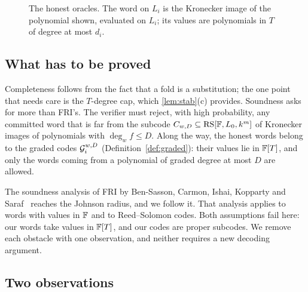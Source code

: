 \begin{figure}[t]
\centering
{}
\caption{The honest oracles. The word on $L_i$ is the Kronecker image of the polynomial shown,
evaluated on $L_i$; its values are polynomials in $T$ of degree at most $d_i$.}
\label{fig:chain}
\end{figure}

\subsection{What has to be proved}\label{sec:ov-target}

Completeness follows from the fact that a fold is a substitution; the one point that needs
care is the $T$-degree cap, which \cref{lem:stab}(c) provides. Soundness asks for more than
FRI's. The verifier must reject, with high probability, any committed word that is far from
the subcode $C_{w,D}\subseteq\mathrm{RS}[\mathbb{F},L_0,k^m]$ of Kronecker images of polynomials with
$\deg_wf\le D$. Along the way, the honest words belong to the graded codes
$\mathcal{G}_i^{w,D}$ (Definition~\ref{def:graded}): their values lie in $\mathbb{F}[T]$, and only the words
coming from a polynomial of graded degree at most $D$ are allowed.

The soundness analysis of FRI by Ben-Sasson, Carmon, Ishai, Kopparty and
Saraf~\cite[\S8]{BCIKS20} reaches the Johnson radius, and we follow it. That analysis
applies to words with values in $\mathbb{F}$ and to Reed--Solomon codes. Both assumptions fail here: our
words take values in $\mathbb{F}[T]$, and our codes are proper subcodes. We remove each obstacle with one
observation, and neither requires a new decoding argument.

\subsection{Two observations}\label{sec:ov-ideas}

